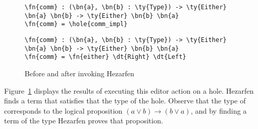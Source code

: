\begin{figure}[h]
\begin{Verbatim}
\fn{comm} : (\bn{a}, \bn{b} : \ty{Type}) -> \ty{Either} \bn{a} \bn{b} -> \ty{Either} \bn{b} \bn{a}
\fn{comm} = \hole{comm_impl}
\end{Verbatim}
  \vspace{1em}
\begin{Verbatim}
\fn{comm} : (\bn{a}, \bn{b} : \ty{Type}) -> \ty{Either} \bn{a} \bn{b} -> \ty{Either} \bn{b} \bn{a}
\fn{comm} = \fn{either} \dt{Right} \dt{Left}
\end{Verbatim}
\caption{Before and after invoking Hezarfen}
  \label{fig:hezarfen-example}
\end{figure}

Figure~\ref{fig:hezarfen-example} displays the results of
executing this editor action on a hole.
Hezarfen finds a term that satisfies that the type of the hole.
Observe that the type of  corresponds to the logical proposition
$(a \lor b) \to (b \lor a)$, and by finding a term of the type Hezarfen proves
that proposition.

